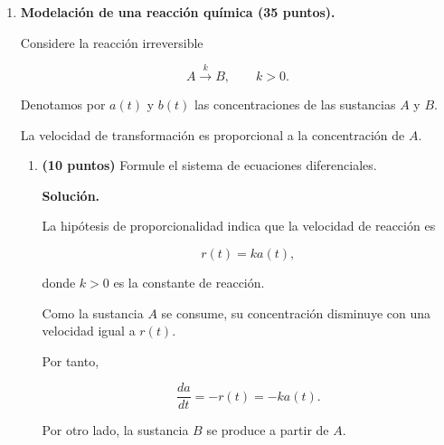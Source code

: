 \documentclass[a4paper,12pt]{article}
\newcommand{\solucion}{
\par\medskip
{\color{solutioncolor}\textbf{Solución.}}
\par
}
\begin{document}
\begin{enumerate}[leftmargin=*,
itemsep=0.8cm]
\begin{enumerate}[label=\alph*),
leftmargin=*,itemsep=0.5cm]
\[
r^2+4r+4=0,
\]

que tiene la raíz doble $r=-2$.

La solución general es

\[
x(t)=(C_1+C_2t)e^{-2t}.
\]

Derivando,

\[
\begin{aligned}
y(t)
&=\dot x(t)\\
&=\left[
C_2-2C_1-2C_2t
\right]e^{-2t}.
\end{aligned}
\]

Como

\[
e^{-2t}\to0,
\qquad
te^{-2t}\to0,
\]

obtenemos

\[
x(t)\to0,\qquad y(t)\to0.
\]

Esto confirma la estabilidad
asintótica del origen.

\end{enumerate}

\item \textbf{Modelación de una
reacción química (35 puntos).}

Considere la reacción irreversible

\[
A\xrightarrow{k}B,
\qquad k>0.
\]

Denotamos por $a(t)$ y $b(t)$
las concentraciones de las
sustancias $A$ y $B$.

La velocidad de transformación
es proporcional a la
concentración de $A$.

\begin{enumerate}[label=\alph*),
leftmargin=*,itemsep=0.5cm]

\item \textbf{(10 puntos)}
Formule el sistema de ecuaciones
diferenciales.

\solucion

La hipótesis de proporcionalidad
indica que la velocidad de
reacción es

\[
r(t)=ka(t),
\]

donde $k>0$ es la constante
de reacción.

Como la sustancia $A$ se consume,
su concentración disminuye
con una velocidad igual a
$r(t)$.

Por tanto,

\[
\frac{da}{dt}=-r(t)=-ka(t).
\]

Por otro lado, la sustancia
$B$ se produce a partir de $A$.


\end{enumerate}
\end{enumerate}
\end{document}
